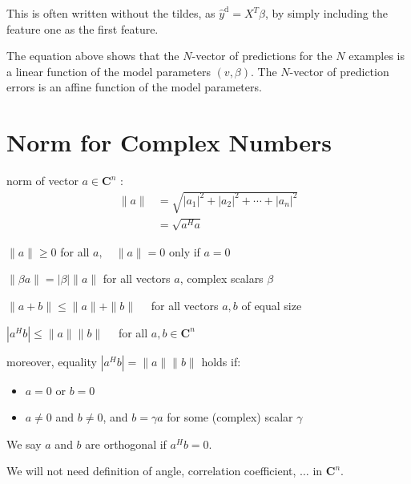  This is often written without the tildes, as $ \hat{y}^{\mathrm{d}}=X^{T} \beta $, by simply including the feature one as the first feature.

The equation above shows that the $ N $-vector of predictions for the $ N $ examples is a linear function of the model parameters $ (v, \beta) $. The $ N $-vector of prediction errors is an affine function of the model parameters.


\section{Norm for Complex Numbers}

\begin{definition}
    norm of vector $ a \in \mathbf{C}^{n} $ :
\begin{equation}
\begin{aligned}
\|a\| &=\sqrt{\left|a_{1}\right|^{2}+\left|a_{2}\right|^{2}+\cdots+\left|a_{n}\right|^{2}} \\
&=\sqrt{a^{H} a}
\end{aligned}
\end{equation}
\end{definition}

\begin{theorem}
$ \|a\| \geq 0 $ for all $ a, \quad\|a\|=0  $ only if $ a=0 $
\end{theorem}

\begin{theorem}
    [Homogeneous]
$ \|\beta a\|=|\beta|\|a\| $ for all vectors $ a $, complex scalars $ \beta $
\end{theorem}

\begin{theorem}
$ \|a+b\| \leq\|a\|+\|b\| \quad $ for all vectors $ a, b $ of equal size
\end{theorem}

\begin{theorem}
    $ \left|a^{H} b\right| \leq\|a\|\|b\| \quad $ for all $ a, b \in \mathbf{C}^{n} $

    moreover, equality $ \left|a^{H} b\right|=\|a\|\|b\| $ holds if:

    \begin{itemize}
        \item $ a=0 $ or $ b=0 $
        \item $ a \neq 0 $ and $ b \neq 0 $, and $ b=\gamma a $ for some (complex) scalar $ \gamma $
    \end{itemize}
\end{theorem}

We say $ a $ and $ b $ are orthogonal if $ a^{H} b=0 $.

We will not need definition of angle, correlation coefficient, $ \ldots $ in $ \mathbf{C}^{n} $.
